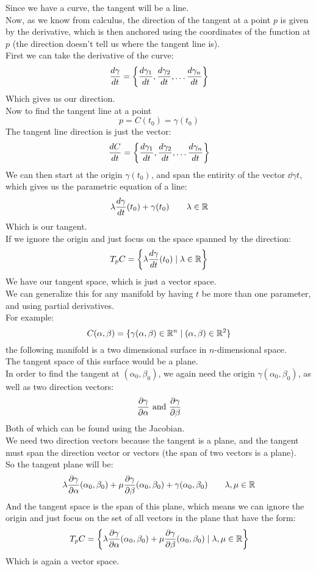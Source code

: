 \documentclass[12pt]{article}
\begin{document}
Since we have a curve, the tangent will be a line. \\
Now, as we know from calculus,
the direction of the tangent at a point $p$
is given by the derivative,
which is then anchored using the coordinates
of the function at $p$
(the direction doesn't tell us where the tangent
line is). \\

First we can take the derivative of the curve:
\[ \dfrac{d\gamma}{dt} = \left\{ \dfrac{d\gamma_1}{dt},
\dfrac{d\gamma_2}{dt}, \dots
\dfrac{d\gamma_n}{dt}  \right\} \]
Which gives us our direction. \\

Now to find the tangent line at a point
\[ p = C(t_0) = \gamma(t_0) \]
The tangent line direction is just the vector:
\[ \dfrac{dC}{dt} = \left\{ \dfrac{d\gamma_1}{dt},
\dfrac{d\gamma_2}{dt}, \dots
\dfrac{d\gamma_n}{dt}  \right\} \]
We can then start at the origin $\gamma(t_0)$,
and span the entirity of the vector $\dd{\gamma}{t}$,
which gives us the parametric equation of a line:
\[ \lambda \dfrac{d\gamma}{dt}(t_0) +
\gamma(t_0) \qquad \lambda \in \mathbb{R} \]
Which is our tangent. \\

If we ignore the origin and just focus
on the space spanned by the direction:
\[ T_pC = \left\{  \lambda \dfrac{d\gamma}{dt}(t_0)
\mid \lambda \in \mathbb{R}  \right\} \]
We have our tangent space,
which is just a vector space. \\

We can generalize this for any manifold
by having $t$ be more than one parameter,
and using partial derivatives. \\

For example:
\[ C(\alpha, \beta) =
\{\gamma(\alpha, \beta) \in \mathbb{R}^n 
\mid (\alpha, \beta) \in \mathbb{R}^2 \} \]
the following manifold is a two dimensional
surface in $n$-dimensional space. \\
The tangent space of this surface would be a
plane. \\
In order to find the tangent at 
$(\alpha_0, \beta_0)$, we again need the origin
$\gamma(\alpha_0, \beta_0)$,
as well as two direction vectors:
\[ \dfrac{\partial \gamma}{\partial \alpha}
\text{ and } \dfrac{\partial \gamma}{\partial \beta} \]
Both of which can be found using the Jacobian. \\
We need two direction vectors because the
tangent is a plane, and the tangent
must span the direction vector or vectors
(the span of two vectors is a plane). \\
So the tangent plane will be:
\[
\lambda \dfrac{\partial \gamma}{\partial \alpha}(\alpha_0, \beta_0) +
\mu \dfrac{\partial \gamma}{\partial \beta}(\alpha_0, \beta_0) +
\gamma(\alpha_0, \beta_0) \qquad
\lambda, \mu \in \mathbb{R} \]
And the tangent space is the
span of this plane, which means we
can ignore the origin and just focus
on the set of all vectors in the plane
that have the form:
\[ T_pC = \left\{  
\lambda \dfrac{\partial \gamma}{\partial \alpha}(\alpha_0, \beta_0)
+ \mu \dfrac{\partial \gamma}{\partial \beta}(\alpha_0, \beta_0) 
\mid \lambda, \mu \in \mathbb{R}  \right\} \]
Which is again a vector space. \\
\end{document}
